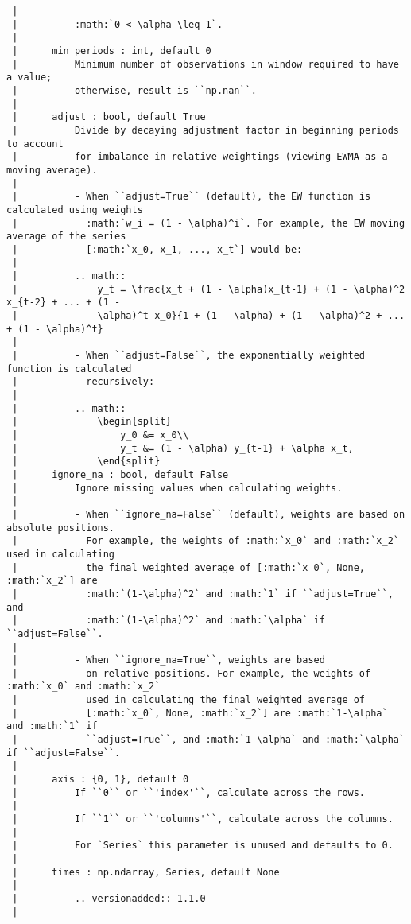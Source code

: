 \documentclass[
  letterpaper,
  DIV=11,
  numbers=noendperiod]{scrreprt}
\begin{document}
\begin{verbatim}
 |      
 |          :math:`0 < \alpha \leq 1`.
 |      
 |      min_periods : int, default 0
 |          Minimum number of observations in window required to have a value;
 |          otherwise, result is ``np.nan``.
 |      
 |      adjust : bool, default True
 |          Divide by decaying adjustment factor in beginning periods to account
 |          for imbalance in relative weightings (viewing EWMA as a moving average).
 |      
 |          - When ``adjust=True`` (default), the EW function is calculated using weights
 |            :math:`w_i = (1 - \alpha)^i`. For example, the EW moving average of the series
 |            [:math:`x_0, x_1, ..., x_t`] would be:
 |      
 |          .. math::
 |              y_t = \frac{x_t + (1 - \alpha)x_{t-1} + (1 - \alpha)^2 x_{t-2} + ... + (1 -
 |              \alpha)^t x_0}{1 + (1 - \alpha) + (1 - \alpha)^2 + ... + (1 - \alpha)^t}
 |      
 |          - When ``adjust=False``, the exponentially weighted function is calculated
 |            recursively:
 |      
 |          .. math::
 |              \begin{split}
 |                  y_0 &= x_0\\
 |                  y_t &= (1 - \alpha) y_{t-1} + \alpha x_t,
 |              \end{split}
 |      ignore_na : bool, default False
 |          Ignore missing values when calculating weights.
 |      
 |          - When ``ignore_na=False`` (default), weights are based on absolute positions.
 |            For example, the weights of :math:`x_0` and :math:`x_2` used in calculating
 |            the final weighted average of [:math:`x_0`, None, :math:`x_2`] are
 |            :math:`(1-\alpha)^2` and :math:`1` if ``adjust=True``, and
 |            :math:`(1-\alpha)^2` and :math:`\alpha` if ``adjust=False``.
 |      
 |          - When ``ignore_na=True``, weights are based
 |            on relative positions. For example, the weights of :math:`x_0` and :math:`x_2`
 |            used in calculating the final weighted average of
 |            [:math:`x_0`, None, :math:`x_2`] are :math:`1-\alpha` and :math:`1` if
 |            ``adjust=True``, and :math:`1-\alpha` and :math:`\alpha` if ``adjust=False``.
 |      
 |      axis : {0, 1}, default 0
 |          If ``0`` or ``'index'``, calculate across the rows.
 |      
 |          If ``1`` or ``'columns'``, calculate across the columns.
 |      
 |          For `Series` this parameter is unused and defaults to 0.
 |      
 |      times : np.ndarray, Series, default None
 |      
 |          .. versionadded:: 1.1.0
 |      

\end{verbatim}
\end{document}
